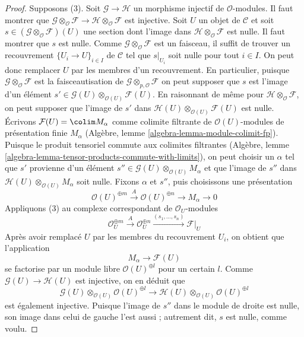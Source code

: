 \begin{proof}
\medskip\noindent

Supposons (3). Soit $\mathcal{G} \to \mathcal{H}$ un morphisme injectif
de $\mathcal{O}$-modules. Il faut montrer que
$\mathcal{G} \otimes_\mathcal{O} \mathcal{F} \to
\mathcal{H} \otimes_\mathcal{O} \mathcal{F}$
est injective. Soit $U$ un objet de $\mathcal{C}$ et soit
$s \in (\mathcal{G} \otimes_\mathcal{O} \mathcal{F})(U)$ une section dont
l'image dans $\mathcal{H} \otimes_\mathcal{O} \mathcal{F}$ est nulle.
Il faut montrer que $s$ est nulle. Comme
$\mathcal{G} \otimes_\mathcal{O} \mathcal{F}$
est un faisceau, il suffit de trouver un recouvrement
$\{U_i \to U\}_{i \in I}$ de $\mathcal{C}$ tel que $s|_{U_i}$ soit nulle
pour tout $i \in I$. On peut donc remplacer $U$ par les membres d'un
recouvrement. En particulier, puisque
$\mathcal{G} \otimes_\mathcal{O} \mathcal{F}$
est la faisceautisation de $\mathcal{G} \otimes_{p, \mathcal{O}} \mathcal{F}$
on peut supposer que $s$ est l'image d'un élément $s' \in 
\mathcal{G}(U) \otimes_{\mathcal{O}(U)} \mathcal{F}(U)$. En raisonnant de
même pour $\mathcal{H} \otimes_\mathcal{O} \mathcal{F}$, on peut supposer
que l'image de $s'$ dans
$\mathcal{H}(U) \otimes_{\mathcal{O}(U)} \mathcal{F}(U)$ est nulle.
Écrivons $\mathcal{F}(U) = \colim M_\alpha$ comme colimite filtrante de
$\mathcal{O}(U)$-modules de présentation finie $M_\alpha$ (Algèbre, lemme
\ref{algebra-lemma-module-colimit-fp}). Puisque le produit tensoriel commute
aux colimites filtrantes (Algèbre, lemme
\ref{algebra-lemma-tensor-products-commute-with-limits}), on peut choisir un
$\alpha$ tel que $s'$ provienne d'un élément
$s'' \in \mathcal{G}(U) \otimes_{\mathcal{O}(U)} M_\alpha$ et que l'image
de $s''$ dans
$\mathcal{H}(U) \otimes_{\mathcal{O}(U)} M_\alpha$ soit nulle. Fixons
$\alpha$ et $s''$, puis choisissons une présentation
$$
\mathcal{O}(U)^{\oplus m} \xrightarrow{A} \mathcal{O}(U)^{\oplus n}
\to M_\alpha \to 0
$$
Appliquons (3) au complexe correspondant de $\mathcal{O}_U$-modules
$$
\mathcal{O}_U^{\oplus m} \xrightarrow{A}
\mathcal{O}_U^{\oplus n} \xrightarrow{(s_1, \ldots, s_n)}
\mathcal{F}|_U
$$
Après avoir remplacé $U$ par les membres du recouvrement $U_i$, on obtient
que l'application
$$
M_\alpha \to \mathcal{F}(U)
$$
se factorise par un module libre $\mathcal{O}(U)^{\oplus l}$ pour un certain
$l$. Comme $\mathcal{G}(U) \to \mathcal{H}(U)$ est injective, on en déduit que
$$
\mathcal{G}(U) \otimes_{\mathcal{O}(U)} \mathcal{O}(U)^{\oplus l}
\to
\mathcal{H}(U) \otimes_{\mathcal{O}(U)} \mathcal{O}(U)^{\oplus l}
$$
est également injective. Puisque l'image de $s''$ dans le module de droite
est nulle, son image dans celui de gauche l'est aussi ; autrement dit,
$s$ est nulle, comme voulu.

\end{proof}

